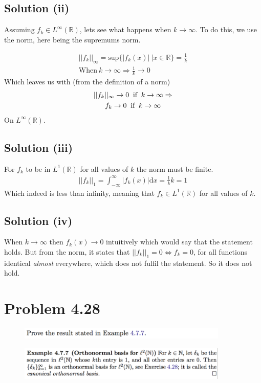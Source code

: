 \documentclass{article}
\begin{document}
\subsection*{Solution (ii)}

Assuming $f_k \in L^\infty(\mathbb{R})$, lets see what happens when $k\rightarrow \infty$. To do this, we use the norm, here being the supremums norm.

\begin{gather*}
    ||f_k||_\infty = \text{sup}\{|f_k(x)|\: | x \in \mathbb{R}\} = \frac{1}{k} \\
    \text{When} \: k \rightarrow \infty \Rightarrow \frac{1}{k} \rightarrow 0
\end{gather*}
Which leaves us with (from the definition of a norm) 
\begin{gather*}
     ||f_k||_\infty \rightarrow 0 \text{\: if \:} k \rightarrow \infty \Rightarrow \\
     f_k \rightarrow 0 \text{\: if \:} k \rightarrow \infty
\end{gather*}
On $L^\infty(\mathbb{R})$.

\subsection*{Solution (iii)}
For $f_k$ to be in $L^1(\mathbb{R})$ for all values of $k$ the norm must be finite. 
\begin{gather*}
    ||f_k||_1 = \int_{-\infty}^{\infty}|f_k(x)| \text{d}x = \frac{1}{k}k = 1
\end{gather*}
Which indeed is less than infinity, meaning that $f_k \in L^1(\mathbb{R})$ for all values of $k$.

\subsection*{Solution (iv)}
When $k \rightarrow \infty$ then $f_k(x) \rightarrow 0$ intuitively which would say that the statement holds. But from the norm, it states that $||f_k||_1 = 0 \Leftrightarrow f_k = 0$, for all functions identical \textit{almost} everywhere, which does not fulfil the statement. So it does not hold. 

\section*{Problem 4.28}
\begin{figure}[H]
    \centering
    \includegraphics[width=10cm]{fig/prob428}
\end{figure}
\vspace{-8mm}
\begin{figure}[H]
    \centering
    \includegraphics[width=10cm]{fig/ex477}
\end{figure}
\end{document}
